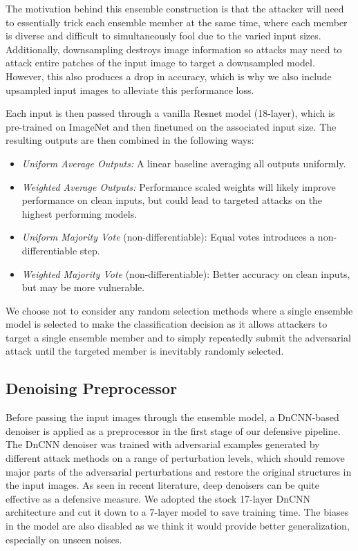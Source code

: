 \documentclass[10pt,journal,compsoc]{IEEEtran}
\begin{document}
The motivation behind this ensemble construction is that the attacker will need to essentially trick each ensemble member at the same time, where each member is diverse and difficult to simultaneously fool due to the varied input sizes. Additionally, downsampling destroys image information so attacks may need to attack entire patches of the input image to target a downsampled model. However, this also produces a drop in accuracy, which is why we also include upsampled input images to alleviate this performance loss.  

Each input is then passed through a vanilla Resnet \cite{resnet} model (18-layer), which is pre-trained on ImageNet and then finetuned on the associated input size. The resulting outputs are then combined in the following ways:
\begin{itemize}[leftmargin=*]
\item \textit{Uniform Average Outputs:} A linear baseline averaging all outputs uniformly.
\item \textit{Weighted Average Outputs:} Performance scaled weights will likely improve performance on clean inputs, but could lead to targeted attacks on the highest performing models.
\item \textit{Uniform Majority Vote} (non-differentiable): Equal votes introduces a non-differentiable step.
\item \textit{Weighted Majority Vote} (non-differentiable): Better accuracy on clean inputs, but may be more vulnerable.
\end{itemize}

We choose not to consider any random selection methods where a single ensemble model is selected to make the classification decision as it allows attackers to target a single ensemble member and to simply repeatedly submit the adversarial attack until the targeted member is inevitably randomly selected. 


\subsection{Denoising Preprocessor}
Before passing the input images through the ensemble model, a DnCNN-based denoiser is applied as a preprocessor in the first stage of our defensive pipeline. The DnCNN denoiser was trained with adversarial examples generated by different attack methods on a range of perturbation levels, which should remove major parts of the adversarial perturbations and restore the original structures in the input images. As seen in recent literature, deep denoisers can be quite effective as a defensive measure. We adopted the stock 17-layer DnCNN architecture and cut it down to a 7-layer model to save training time. The biases in the model are also disabled as we think it would provide better generalization, especially on unseen noises.
\end{document}
